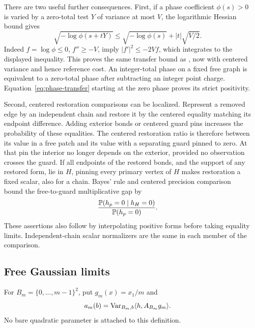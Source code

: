 There are two useful further consequences. First, if a phase
coefficient \(\phi(s)>0\) is varied by a zero-total test \(Y\) of
variance at most \(V\), the logarithmic Hessian bound gives
\begin{equation}
 \sqrt{-\log\phi(s+tY)}
 \le \sqrt{-\log\phi(s)}+|t|\sqrt{V/2}.
 \label{eq:phase-transfer}
\end{equation}
Indeed \(f=\log\phi\le0\), \(f''\ge-V\), imply
\(|f'|^2\le-2Vf\), which integrates to the displayed inequality.
This proves the same transfer bound as ,
now with centered variance and hence reference cost.
An integer-total phase on a fixed free graph is equivalent to a
zero-total phase after subtracting an integer point charge.
Equation~\eqref{eq:phase-transfer} starting at the zero phase proves
its strict positivity.

Second, centered restoration comparisons can be localized.
Represent a removed edge by an independent chain and restore it
by the centered equality matching its endpoint difference.
Adding exterior bonds or centered guard pins increases the
probability of these equalities. The centered restoration ratio is
therefore between its value in a free patch and its value with a
separating guard pinned to zero. At that pin the interior no longer
depends on the exterior, provided no observation crosses the guard.
If all endpoints of the restored bonds, and the support of any
restored form, lie in \(H\), pinning every primary vertex of \(H\)
makes restoration a fixed scalar, also for a chain. Bayes' rule and
centered precision comparison bound the free-to-guard multiplicative
gap by
\begin{equation}
 \frac{\mathbb P(h_p=0\mid h_H=0)}{\mathbb P(h_p=0)}.
 \label{eq:centered-restoration-gap}
\end{equation}
These assertions also follow by interpolating positive forms before
taking equality limits. Independent-chain scalar normalizers are
the same in each member of the comparison.

\subsection{Free Gaussian limits}

For \(B_m=\{0,\ldots,m-1\}^2\), put \(g_m(x)=x_1/m\) and
\[
 a_m(b)=\operatorname{Var}_{B_m,b}\langle h,A_{B_m}g_m\rangle.
\]
No bare quadratic parameter is attached to this definition.

